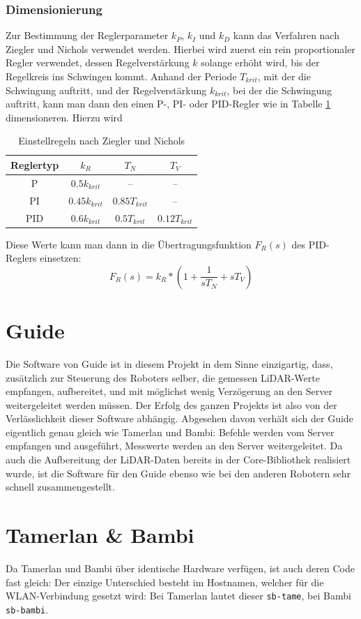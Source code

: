 \subsubsection{Dimensionierung}
Zur Bestimmung der Reglerparameter $k_P$, $k_I$ und $k_D$
kann das Verfahren nach Ziegler und Nichols verwendet werden.
%
Hierbei wird zuerst ein rein proportionaler Regler verwendet,
dessen Regelverstärkung $k$ solange erhöht wird,
bis der Regelkreis ins Schwingen kommt.
%
Anhand der Periode $T_{krit}$, mit der die Schwingung auftritt,
und der Regelverstärkung $k_{krit}$, bei der die Schwingung auftritt,
kann man dann den einen P-, PI- oder PID-Regler wie in Tabelle \ref{tab:ziegler_nichols} dimensioneren.
%
Hierzu wird 
\begin{table}[H]
    \centering
    \begin{tabular}{c|c|c|c}
    Reglertyp & $k_R$ & $T_N$ & $T_V$ \\ \hline
    P   & $0.5 k_{krit}$  &        --       & -- \\ \hline
    PI  & $0.45 k_{krit}$ & $0.85 T_{krit}$ & -- \\ \hline
    PID & $0.6 k_{krit}$  & $0.5 T_{krit}$  & $0.12 T_{krit}$ \\
    \end{tabular}
    \caption{Einstellregeln nach Ziegler und Nichols}
    \label{tab:ziegler_nichols}
\end{table}
%
Diese Werte kann man dann in die Übertragungsfunktion $F_R(s)$ des PID-Reglers einsetzen:
%
\begin{equation}
    F_R(s) = k_R*\left(1 + \frac{1}{s T_N} + s T_V\right)
\end{equation}
%

\section{Guide}
\label{subsec:software_guide}
Die Software von Guide ist in diesem Projekt in dem Sinne einzigartig,
dass,
zusätzlich zur Steuerung des Roboters selber,
die gemessen LiDAR-Werte empfangen,
aufbereitet,
und mit möglichst wenig Verzögerung an den Server weitergeleitet werden müssen.
%
Der Erfolg des ganzen Projekts ist also von der Verlässlichkeit dieser Software abhängig.
%
Abgesehen davon verhält sich der Guide eigentlich genau gleich wie Tamerlan und Bambi:
%
Befehle werden vom Server empfangen und ausgeführt,
Messwerte werden an den Server weitergeleitet.
%
Da auch die Aufbereitung der LiDAR-Daten bereits in der Core-Bibliothek realisiert wurde,
ist die Software für den Guide ebenso wie bei den anderen Robotern sehr schnell zusammengestellt.

\section{Tamerlan \& Bambi}
\label{subsec:software_tamerlan}
Da Tamerlan und Bambi über identische Hardware verfügen,
ist auch deren Code fast gleich:
%
Der einzige Unterschied besteht im Hostnamen, welcher für die WLAN-Verbindung gesetzt wird:
%
Bei Tamerlan lautet dieser \texttt{sb-tame}, bei Bambi \texttt{sb-bambi}.
